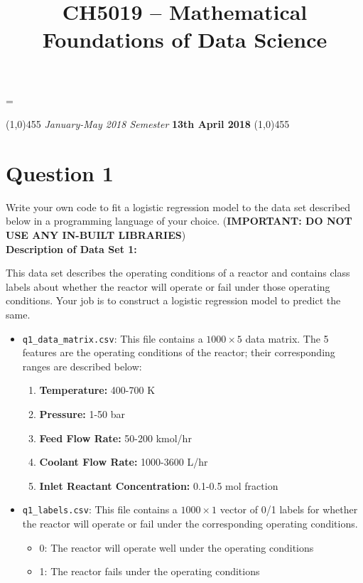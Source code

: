 \documentclass[11pt,a4paper]{article}
\title{\textbf{CH5019 -- Mathematical Foundations of Data Science} \\ \vspace{1ex}\ppl{Term Project}}
\date{\vspace{-15ex}}
\begin{document}
	
	\setlength{\parindent}{0pt}
	\parskip = \baselineskip
	
	\maketitle

	\line(1,0){455}
	\vspace{0.5ex}	
	\textit{January-May 2018 Semester} \hfill \textbf{13th April 2018}
	\vspace{-1.9ex}
	\line(1,0){455}
	
	
	\section*{Question 1}
		
	Write your own code to fit a logistic regression model to the data set described below in a programming language of your choice. (\textbf{IMPORTANT: DO NOT USE ANY IN-BUILT LIBRARIES}) \\
	
	\textbf{Description of Data Set 1:}
	
	This data set describes the operating conditions of a reactor and contains class labels about whether the reactor will operate or fail under those operating conditions. Your job is to construct a logistic regression model to predict the same. 
	
	\begin{itemize}
		\item \texttt{q1\_data\_matrix.csv}: This file contains a $ 1000 \times 5 $ data matrix. The 5 features are the operating conditions of the reactor; their corresponding ranges are described below:
		\begin{enumerate}
			\item \textbf{Temperature:} 400-700 K
			\item \textbf{Pressure:} 1-50 bar
			\item \textbf{Feed Flow Rate:} 50-200 kmol/hr
			\item \textbf{Coolant Flow Rate:} 1000-3600 L/hr
			\item \textbf{Inlet Reactant Concentration:} 0.1-0.5 mol fraction
		\end{enumerate}
		\item \texttt{q1\_labels.csv}: This file contains a $ 1000 \times 1 $ vector of 0/1 labels for whether the reactor will operate or fail under the corresponding operating conditions. 
		\begin{itemize}
			\item 0: The reactor will operate well under the operating conditions
			\item 1: The reactor fails under the operating conditions
		\end{itemize}
	\end{itemize}
\end{document}
